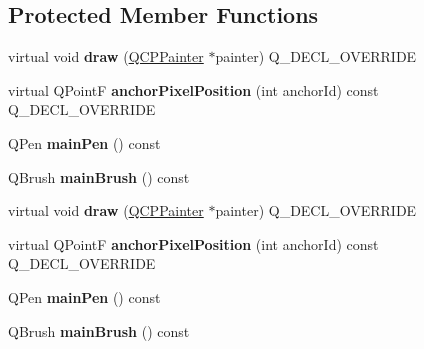 \subsection*{Protected Member Functions}
\begin{DoxyCompactItemize}
\item 
virtual void {\bfseries draw} (\hyperlink{class_q_c_p_painter}{Q\+C\+P\+Painter} $\ast$painter) Q\+\_\+\+D\+E\+C\+L\+\_\+\+O\+V\+E\+R\+R\+I\+DE\hypertarget{class_q_c_p_item_ellipse_a77eebd67a402fc496082a2e51356928c}{}\label{class_q_c_p_item_ellipse_a77eebd67a402fc496082a2e51356928c}

\item 
virtual Q\+PointF {\bfseries anchor\+Pixel\+Position} (int anchor\+Id) const Q\+\_\+\+D\+E\+C\+L\+\_\+\+O\+V\+E\+R\+R\+I\+DE\hypertarget{class_q_c_p_item_ellipse_a35cd6983c61a16ac33c23f08dd2817cc}{}\label{class_q_c_p_item_ellipse_a35cd6983c61a16ac33c23f08dd2817cc}

\item 
Q\+Pen {\bfseries main\+Pen} () const \hypertarget{class_q_c_p_item_ellipse_afc78d49ed5ffa886bccf18f297f83d30}{}\label{class_q_c_p_item_ellipse_afc78d49ed5ffa886bccf18f297f83d30}

\item 
Q\+Brush {\bfseries main\+Brush} () const \hypertarget{class_q_c_p_item_ellipse_a2a9757204877c9d0fd07adfb26d6b1d8}{}\label{class_q_c_p_item_ellipse_a2a9757204877c9d0fd07adfb26d6b1d8}

\item 
virtual void {\bfseries draw} (\hyperlink{class_q_c_p_painter}{Q\+C\+P\+Painter} $\ast$painter) Q\+\_\+\+D\+E\+C\+L\+\_\+\+O\+V\+E\+R\+R\+I\+DE\hypertarget{class_q_c_p_item_ellipse_ad0ec07724af3430dff1c64774ec237db}{}\label{class_q_c_p_item_ellipse_ad0ec07724af3430dff1c64774ec237db}

\item 
virtual Q\+PointF {\bfseries anchor\+Pixel\+Position} (int anchor\+Id) const Q\+\_\+\+D\+E\+C\+L\+\_\+\+O\+V\+E\+R\+R\+I\+DE\hypertarget{class_q_c_p_item_ellipse_a6892d099d160b3941b78e9f7e9a4fabc}{}\label{class_q_c_p_item_ellipse_a6892d099d160b3941b78e9f7e9a4fabc}

\item 
Q\+Pen {\bfseries main\+Pen} () const \hypertarget{class_q_c_p_item_ellipse_afc78d49ed5ffa886bccf18f297f83d30}{}\label{class_q_c_p_item_ellipse_afc78d49ed5ffa886bccf18f297f83d30}

\item 
Q\+Brush {\bfseries main\+Brush} () const \hypertarget{class_q_c_p_item_ellipse_a2a9757204877c9d0fd07adfb26d6b1d8}{}\label{class_q_c_p_item_ellipse_a2a9757204877c9d0fd07adfb26d6b1d8}

\end{DoxyCompactItemize}
